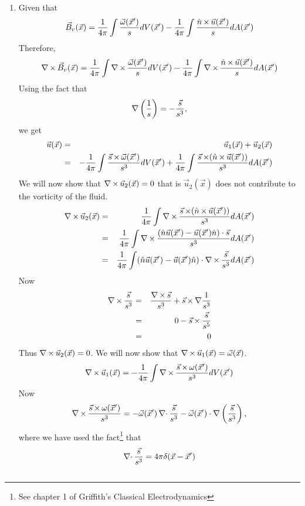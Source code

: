 \begin{enumerate}
\item Given that
\[
\vec{B}_v(\vec{x}) = \frac{1}{4\pi}\int\frac{\vec{\omega}(\vec{x}^{\prime})}{s}dV(\vec{x}^{\prime}) - \frac{1}{4\pi}\int\frac{\hat{n}\operatorname{\times}\vec{u}(\vec{x}^{\prime})}{s}dA(\vec{x}^{\prime})
\]
Therefore,
\[
\operatorname{\nabla\operatorname{\times}}\vec{B}_v(\vec{x}) = \frac{1}{4\pi}\int\operatorname{\nabla\operatorname{\times}}\frac{\vec{\omega}(\vec{x}^{\prime})}{s}dV(\vec{x}^{\prime}) - 
\frac{1}{4\pi}\int\operatorname{\nabla\operatorname{\times}}\frac{\hat{n}\operatorname{\times}\vec{u}(\vec{x}^{\prime})}{s}dA(\vec{x}^{\prime})
\]
Using the fact that 
\[
\operatorname{\nabla}\left(\frac{1}{s}\right) = -\frac{\vec{s}}{s^3},
\] 
we get
\begin{eqnarray*}\nonumber
\vec{u}(\vec{x}) &=& \vec{u}_1(\vec{x}) + \vec{u}_2(\vec{x})	\\
 &=& -\frac{1}{4\pi}\int\frac{\vec{s}\operatorname{\times}\vec{\omega}(\vec{x}^{\prime})}{s^3}dV(\vec{x}^{\prime})+
\frac{1}{4\pi}\int\frac{\vec{s}\operatorname{\times}(\hat{n}\operatorname{\times}\vec{u}(\vec{x}^{\prime}))}{s^3}dA(\vec{x}^{\prime})
\end{eqnarray*}
We will now show that $\operatorname{\nabla\operatorname{\times}}\vec{u}_2(\vec{x})=0$ that is $\vec{u}_2(\vec{x})$ does not contribute to the vorticity of the fluid.
\begin{eqnarray*}
\operatorname{\nabla\operatorname{\times}}\vec{u}_2(\vec{x}) &=& \frac{1}{4\pi}\int\operatorname{\nabla\operatorname{\times}}\frac{\vec{s}\operatorname{\times}(\hat{n}\operatorname{\times}\vec{u}(\vec{x}^{\prime}))}{s^3}dA(\vec{x}^{\prime})	\\
 &=& \frac{1}{4\pi}\int\operatorname{\nabla\operatorname{\times}}\frac{(\hat{n}\vec{u}(\vec{x}^{\prime})-\vec{u}(\vec{x}^{\prime})\hat{n})\cdot\vec{s}}{s^3}dA(\vec{x}^{\prime})	\\
 &=& \frac{1}{4\pi}\int(\hat{n}\vec{u}(\vec{x}^{\prime})-\vec{u}(\vec{x}^{\prime})\hat{n})\cdot\operatorname{\nabla\operatorname{\times}}\frac{\vec{s}}{s^3}dA(\vec{x}^{\prime})
\end{eqnarray*}
Now 
\begin{eqnarray*}
\operatorname{\nabla\operatorname{\times}}\frac{\vec{s}}{s^3} &=& \frac{\operatorname{\nabla\operatorname{\times}}\vec{s}}{s^3} + \vec{s}\operatorname{\times}\nabla\frac{1}{s^3}	\\
 &=& 0 - \vec{s}\operatorname{\times}\frac{\vec{s}}{s^5}\\
 &=& 0
\end{eqnarray*}
Thus $\operatorname{\nabla\operatorname{\times}}\vec{u}_2(\vec{x}) = 0$. 
We will now show that $\operatorname{\nabla\operatorname{\times}}\vec{u}_1(\vec{x}) = \vec{\omega}(\vec{x})$.
\[
\operatorname{\nabla\operatorname{\times}}\vec{u}_1(\vec{x}) = -\frac{1}{4\pi}\int\operatorname{\nabla\operatorname{\times}}\frac{\vec{s}\operatorname{\times}\omega(\vec{x}^{\prime})}{s^3}dV(\vec{x}^{\prime})	
\]
Now
\[
\operatorname{\nabla\operatorname{\times}}\frac{\vec{s}\operatorname{\times}\omega(\vec{x}^{\prime})}{s^3} = -\vec{\omega}(\vec{x}^{\prime})\operatorname{\nabla\cdot}\frac{\vec{s}}{s^3} - \vec{\omega}(\vec{x}^{\prime})\cdot\operatorname{\nabla}\left(\frac{\vec{s}}{s^3}\right),
\]
where we have used the fact{\footnote{See chapter 1 of Griffith's Classical Electrodynamics\cite{griffiths1999introduction}}} that
\[
\operatorname{\nabla\cdot}\frac{\vec{s}}{s^3} = 4\pi\delta(\vec{x}-\vec{x}^{\prime})
\]
\begin{eqnarray*}

\end{eqnarray*}
\end{enumerate}
